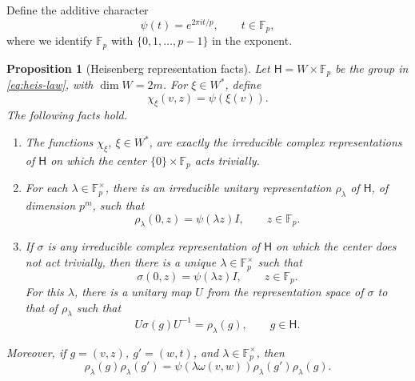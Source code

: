 \documentclass[11pt, reqno]{amsart}
\numberwithin{equation}{section}
\newtheorem{proposition}[theorem]{Proposition}
\newcommand{\Fp}{\mathbb F_p}
\newcommand{\Heis}{\mathsf H}
\begin{document}
Define the additive character
\[
    \psi(t)=e^{2\pi i t/p},\qquad t\in\mathbb F_p,
\]
where we identify \(\mathbb F_p\) with \(\{0,1,\ldots,p-1\}\) in the
exponent.

\begin{proposition}[Heisenberg representation facts]\label{prop:heis-reps}
Let \(\Heis=W\times\Fp\) be the group in \eqref{eq:heis-law}, with
\(\dim W=2m\).  For \(\xi\in W^*\), define
\[
    \chi_\xi(v,z)=\psi(\xi(v)).
\]
The following facts hold.
\begin{enumerate}[label=\textup{(\roman*)}, leftmargin=*]
    \item The functions \(\chi_\xi\), \(\xi\in W^*\), are exactly the
    irreducible complex representations of \(\Heis\) on which the center
    \(\{0\}\times\Fp\) acts trivially.
    \item For each \(\lambda\in\Fp^\times\), there is an irreducible unitary
    representation \(\rho_\lambda\) of \(\Heis\), of dimension \(p^m\), such
    that
    \[
        \rho_\lambda(0,z)=\psi(\lambda z)I,\qquad z\in\Fp.
    \]
    \item If \(\sigma\) is any irreducible complex representation of \(\Heis\)
    on which the center does not act trivially, then there is a unique
    \(\lambda\in\Fp^\times\) such that
    \[
        \sigma(0,z)=\psi(\lambda z)I,\qquad z\in\Fp.
    \]
    For this \(\lambda\), there is a unitary map \(U\) from the representation
    space of \(\sigma\) to that of \(\rho_\lambda\) such that
    \[
        U\sigma(g)U^{-1}=\rho_\lambda(g),\qquad g\in\Heis.
    \]
\end{enumerate}
Moreover, if \(g=(v,z)\), \(g'=(w,t)\), and \(\lambda\in\Fp^\times\), then
\begin{equation}\label{eq:heis-projective-commutation}
    \rho_\lambda(g)\rho_\lambda(g')
    =
    \psi(\lambda\omega(v,w))\rho_\lambda(g')\rho_\lambda(g).
\end{equation}
\end{proposition}
\end{document}
